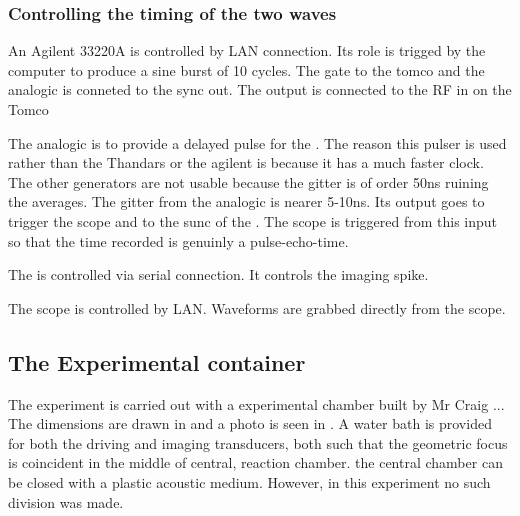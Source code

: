 \subsubsection{Controlling the timing of the two waves}
An Agilent  33220A is controlled by LAN connection.  Its role is trigged by the computer to produce a sine burst of 10 cycles.  The gate to the tomco and the analogic is conneted to the sync out.  The output is connected to the RF in on the Tomco

The analogic is to provide a delayed pulse for the .  The reason this pulser is used rather than the Thandars or the agilent is because it has a much faster clock.  The other generators are not usable because the gitter is of order 50ns  ruining the averages.  The gitter from the analogic is nearer 5-10ns.  Its output goes to trigger the scope and to the sunc of the .  The scope is triggered from this input so that the time recorded is genuinly a pulse-echo-time.


The  is controlled via serial connection.  It controls the imaging spike.

The scope is controlled by LAN. Waveforms are grabbed directly from the scope.










\subsection{The Experimental container}
The experiment is carried out with a experimental chamber built by Mr Craig ...
The dimensions are drawn in 
and a photo is seen in .
A water bath is provided for both the driving and imaging transducers,
both such that the geometric focus is coincident in the middle of central,
reaction chamber.
the central chamber can be closed with a plastic acoustic medium.
However,
in this experiment no such division was made.


